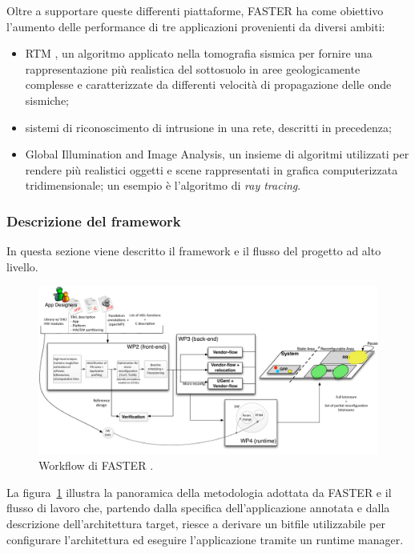 Oltre a supportare queste differenti piattaforme, \ac{FASTER} ha come obiettivo 
l'aumento delle performance di tre applicazioni provenienti da diversi ambiti:
\begin{itemize}
 \item \acf{RTM} \cite{RTMArticle}, un algoritmo applicato nella tomografia sismica per 
fornire una rappresentazione più realistica del sottosuolo in aree 
geologicamente complesse e caratterizzate da differenti velocità di 
propagazione delle onde sismiche;
 \item sistemi di riconoscimento di intrusione in una rete, descritti in 
precedenza;
 \item Global Illumination and Image Analysis, un insieme di algoritmi 
utilizzati per rendere più realistici oggetti e scene rappresentati in grafica 
computerizzata tridimensionale; un esempio è l'algoritmo di \emph{ray tracing}.
\end{itemize}

\subsubsection{Descrizione del framework}
In questa sezione viene descritto il framework e il flusso del progetto ad  
alto livello.

\begin{figure}
 \begin{center}  
\includegraphics[width=\textwidth]
{capitoli/figure/cap2/FASTERWorkflow.pdf}
\caption[Workflow di \acs{FASTER}]{Workflow di \acs{FASTER} \cite{FasterApproach}.}
\label{fig:FASTERWorkflow}
 \end{center}
\end{figure}

La figura~\ref{fig:FASTERWorkflow} illustra la panoramica della metodologia 
adottata da \ac{FASTER} e il flusso di lavoro che, partendo dalla specifica 
dell'applicazione annotata e dalla descrizione dell'architettura target, riesce 
a derivare un bitfile utilizzabile per configurare l'architettura ed eseguire 
l'applicazione tramite un runtime manager.

